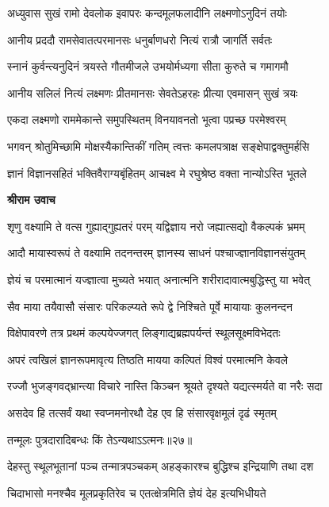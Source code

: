 \twolineshloka
{अध्युवास सुखं रामो देवलोक इवापरः}
{कन्दमूलफलादीनि लक्ष्मणोऽनुदिनं तयोः} %

\twolineshloka
{आनीय प्रददौ रामसेवातत्परमानसः}
{धनुर्बाणधरो नित्यं रात्रौ जागर्ति सर्वतः} %

\twolineshloka
{स्नानं कुर्वन्त्यनुदिनं त्रयस्ते गौतमीजले}
{उभयोर्मध्यगा सीता कुरुते च गमागमौ} %

\twolineshloka
{आनीय सलिलं नित्यं लक्ष्मणः प्रीतमानसः}
{सेवतेऽहरहः प्रीत्या एवमासन् सुखं त्रयः} %

\twolineshloka
{एकदा लक्ष्मणो राममेकान्ते समुपस्थितम्}
{विनयावनतो भूत्वा पप्रच्छ परमेश्वरम्} %

\twolineshloka
{भगवन् श्रोतुमिच्छामि मोक्षस्यैकान्तिकीं गतिम्}
{त्वत्तः कमलपत्राक्ष सङ्क्षेपाद्वक्तुमर्हसि} %

\twolineshloka
{ज्ञानं विज्ञानसहितं भक्तिवैराग्यबृंहितम्}
{आचक्ष्व मे रघुश्रेष्ठ वक्ता नान्योऽस्ति भूतले} %

\textbf{श्रीराम उवाच}

\twolineshloka
{शृणु वक्ष्यामि ते वत्स गुह्याद्गुह्यतरं परम्}
{यद्विज्ञाय नरो जह्यात्सद्यो वैकल्पकं भ्रमम्} %

\twolineshloka
{आदौ मायास्वरूपं ते वक्ष्यामि तदनन्तरम्}
{ज्ञानस्य साधनं पश्चाज्ज्ञानविज्ञानसंयुतम्} %

\twolineshloka
{ज्ञेयं च परमात्मानं यज्ज्ञात्वा मुच्यते भयात्}
{अनात्मनि शरीरादावात्मबुद्धिस्तु या भवेत्} %

\twolineshloka
{सैव माया तयैवासौ संसारः परिकल्प्यते}
{रूपे द्वे निश्चिते पूर्वे मायायाः कुलनन्दन} %

\twolineshloka
{विक्षेपावरणे तत्र प्रथमं कल्पयेज्जगत्}
{लिङ्गाद्यब्रह्मपर्यन्तं स्थूलसूक्ष्मविभेदतः} %

\twolineshloka
{अपरं त्वखिलं ज्ञानरूपमावृत्य तिष्ठति}
{मायया कल्पितं विश्वं परमात्मनि केवले} %

\twolineshloka
{रज्जौ भुजङ्गवद्भ्रान्त्या विचारे नास्ति किञ्चन}
{श्रूयते दृश्यते यद्यत्स्मर्यते वा नरैः सदा} %

\twolineshloka
{असदेव हि तत्सर्वं यथा स्वप्नमनोरथौ}
{देह एव हि संसारवृक्षमूलं दृढं स्मृतम्} %

{तन्मूलः पुत्रदारादिबन्धः किं तेऽन्यथाऽऽत्मनः॥२७॥} %


\twolineshloka
{देहस्तु स्थूलभूतानां पञ्च तन्मात्रपञ्चकम्}
{अहङ्कारश्च बुद्धिश्च इन्द्रियाणि तथा दश} %

\twolineshloka
{चिदाभासो मनश्चैव मूलप्रकृतिरेव च}
{एतत्क्षेत्रमिति ज्ञेयं देह इत्यभिधीयते} %

